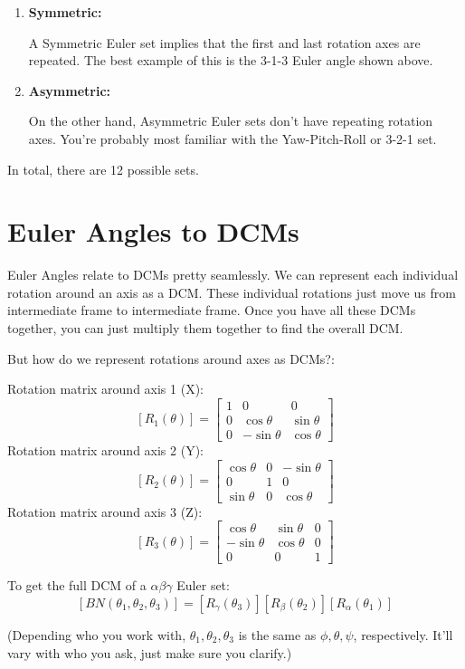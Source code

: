 \documentclass[a4paper,14pt]{extreport}
\begin{document}
\begin{enumerate}
\item{\textbf{Symmetric:}

A Symmetric Euler set implies that the first and last rotation axes are repeated. The best example of this is the 3-1-3 Euler angle shown above.}

\item{\textbf{Asymmetric:}

On the other hand, Asymmetric Euler sets don't have repeating rotation axes. You're probably most familiar with the Yaw-Pitch-Roll or 3-2-1 set.}
\end{enumerate}

In total, there are 12 possible sets.
\section{Euler Angles to DCMs}
Euler Angles relate to DCMs pretty seamlessly. We can represent each individual rotation around an axis as a DCM. These individual rotations just move us from intermediate frame to intermediate frame. Once you have all these DCMs together, you can just multiply them together to find the overall DCM. 

But how do we represent rotations around axes as DCMs?:
\begin{center}
Rotation matrix around axis 1 (X):
\[[R_1(\theta)] = \begin{bmatrix}
			1&0&0\\
			0&\cos{\theta}&\sin{\theta}\\
			0&-\sin{\theta}&\cos{\theta}
	\end{bmatrix}\]	
Rotation matrix around axis 2 (Y):
\[[R_2(\theta)] = \begin{bmatrix}
		\cos{\theta}&0&-\sin{\theta}\\
		0&1&0\\
		\sin{\theta}&0&\cos{\theta}
	\end{bmatrix}\]
Rotation matrix around axis 3 (Z):
\[[R_3(\theta)] = \begin{bmatrix}
		\cos{\theta}&\sin{\theta}&0\\
		-\sin{\theta}&\cos{\theta}&0\\
		0&0&1
	\end{bmatrix}\]

To get the full DCM of a $\alpha\beta\gamma$ Euler set:
\[[BN(\theta_1,\theta_2,\theta_3)] = [R_\gamma(\theta_3)][R_\beta(\theta_2)][R_\alpha(\theta_1)]\]
\end{center}
(Depending who you work with, $\theta_1,\theta_2,\theta_3$ is the same as $\phi,\theta,\psi$, respectively. It'll vary with who you ask, just make sure you clarify.)
\end{document}
